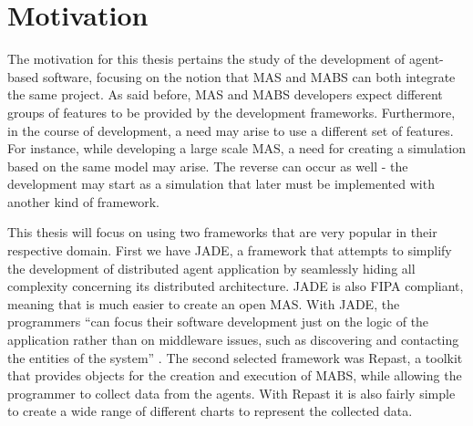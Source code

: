 \section{Motivation} \label{sec:goals}


The motivation for this thesis pertains the study of the development of agent-based software, focusing on the notion that MAS and MABS can both integrate the same project. As said before, MAS and MABS developers expect different groups of features to be provided by the development frameworks. Furthermore, in the course of development, a need may arise to use a different set of features. For instance, while developing a large scale MAS, a need for creating a simulation based on the same model may arise. The reverse can occur as well - the development may start as a simulation that later must be implemented with another kind of framework.

This thesis will focus on using two frameworks that are very popular in their respective domain. First we have JADE, a framework that attempts to simplify the development of distributed agent application by seamlessly hiding all complexity concerning its distributed architecture. JADE is also FIPA compliant, meaning that is much easier to create an open MAS. With JADE, the programmers ``can focus their software development just on the logic of the application rather than on middleware issues, such as discovering and contacting the entities of the system'' \cite{bellifemine2003jade}. The second selected framework was Repast, a toolkit that provides objects for the creation and execution of MABS, while allowing the programmer to collect data from the agents. With Repast it is also fairly simple to create a wide range of different charts to represent the collected data.

